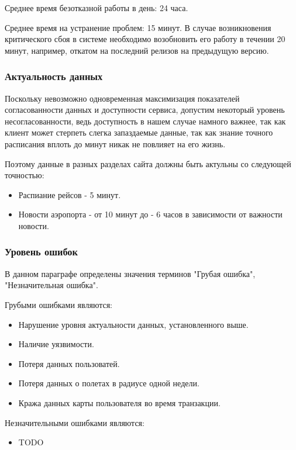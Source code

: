Среднее время безотказной работы в день: 24 часа.

Среднее время на устранение проблем: 15 минут.
В случае возникновения критического сбоя в системе
необходимо возобновить его работу в течении 20 минут,
например, откатом на последний релизов на 
предыдущую версию.

\subsubsection{Актуальность данных}

Поскольку невозможно одновременная максимизация
показателей согласованности данных и доступности 
сервиса, допустим некоторый уровень несогласованности,
ведь доступность в нашем случае намного важнее,
так как клиент может стерпеть слегка запаздаемые
данные, так как знание точного расписания вплоть до
минут никак не повлияет на его жизнь.

Поэтому данные в разных разделах сайта должны 
быть актульны со следующей точностью:
\begin{itemize}
  \item Распиание рейсов - 5 минут.
  \item Новости аэропорта - от 10 минут
        до - 6 часов в зависимости от
        важности новости.
\end{itemize}

\subsubsection{Уровень ошибок}

В данном параграфе определены значения терминов
"Грубая ошибка", "Незначительная ошибка".

Грубыми ошибками являются:
\begin{itemize}
  \item Нарушение уровня актуальности данных, 
        установленного выше.
  \item Наличие уязвимости.
  \item Потеря данных пользоватей.
  \item Потеря данных о полетах 
        в радиусе одной недели.
  \item Кража данных карты пользователя во время
      транзакции.
\end{itemize}

Незначительными ошибками являются:
\begin{itemize}
  \item TODO
\end{itemize}


